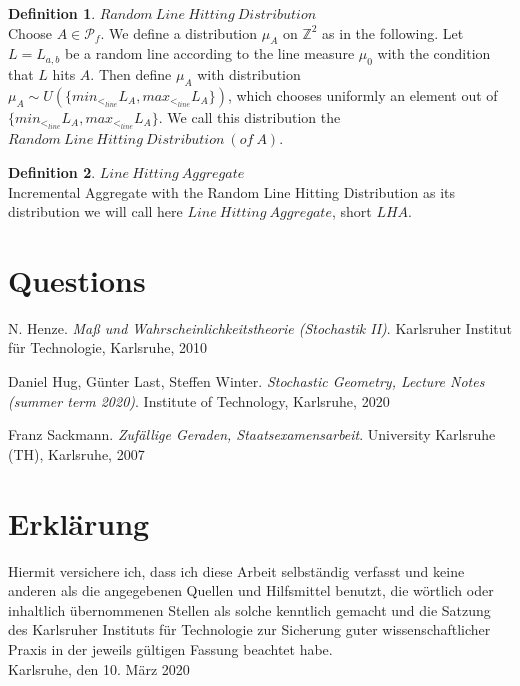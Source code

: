\documentclass[12pt,a4paper]{scrartcl}
\numberwithin{equation}{subsection}
\newcommand{\1}{\mathbbm{1}}
\numberwithin{equation}{section}
\theoremstyle{definition}
\newtheorem{definition}{Definition}[subsection]
\begin{document}
\begin{definition} $\mathit{Random\ Line\ Hitting\ Distribution}$\\
	\indent Choose $A\in \mathcal{P}_f$. We define a distribution $\mu_A$ on $\mathbb{Z}^2$ as in the following. 
	Let $L=L_{a,b}$ be a random line according to the line measure $\mu_0$ with the condition that $L$ hits $A$. Then define $\mu_A$ with distribution $\mu_A \sim U(\{min_{<_{line}}L_A, max_{<_{line}}L_A\})$, which chooses uniformly an element out of $\{min_{<_{line}}L_A, max_{<_{line}}L_A\}$. We call this distribution the $\mathit{Random\ Line\ Hitting\ Distribution\ (of\ A)}$.
\end{definition}

\begin{definition} $\mathit{Line\ Hitting\ Aggregate}$\\
	\indent Incremental Aggregate with the Random Line Hitting Distribution as its distribution we will call here $\mathit{Line\ Hitting\ Aggregate}$, short $\mathit{LHA}$. 
\end{definition}

\newpage
\section{Questions}

\newpage

\begin{thebibliography}{biblio}
\thispagestyle{empty}

N. Henze.
\emph{Maß und Wahrscheinlichkeitstheorie (Stochastik II)}.
Karlsruher Institut für Technologie, Karlsruhe, 2010

Daniel Hug, Günter Last, Steffen Winter.
\emph{Stochastic Geometry, 	Lecture Notes (summer term 2020)}.
Institute of Technology, Karlsruhe, 2020

Franz Sackmann. 
\emph{Zufällige Geraden, Staatsexamensarbeit}.
University Karlsruhe (TH), Karlsruhe, 2007



\end{thebibliography}

\newpage
  
\thispagestyle{empty}

\vspace*{8cm}


\section*{Erklärung}

Hiermit versichere ich, dass ich diese Arbeit selbständig verfasst und keine anderen als die angegebenen Quellen und Hilfsmittel benutzt, die wörtlich oder inhaltlich übernommenen Stellen als solche kenntlich gemacht und die Satzung des Karlsruher Instituts für Technologie zur Sicherung guter wissenschaftlicher Praxis in der jeweils gültigen Fassung beachtet habe. \\[2ex] 

\noindent
Karlsruhe, den 10. März 2020\\[5ex] 
\end{document}
